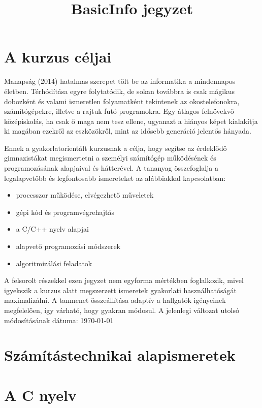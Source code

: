 \documentclass[11pt,a4paper,oneside]{report}             %
\begin{document}
\title{BasicInfo jegyzet}
\maketitle

\tableofcontents


\chapter*{A kurzus céljai}
Manapság (2014) hatalmas szerepet tölt be az informatika a mindennapos életben. Térhódítása egyre folytatódik, de sokan továbbra is csak mágikus dobozként és valami ismeretlen folyamatként tekintenek az okostelefonokra, számítógépekre, illetve a rajtuk futó programokra. Egy átlagos felnövekvő középiskolás, ha csak ő maga nem tesz ellene, ugyanazt a hiányos képet kialakítja ki magában ezekről az eszközökről, mint az idősebb generáció jelentős hányada.

Ennek a gyakorlatorientált kurzusnak a célja, hogy segítse az érdeklődő gimnazistákat megismertetni a személyi számítógép működésének és programozásának alapjaival és hátterével. A tananyag összefoglalja a legalapvetőbb és legfontosabb ismereteket az alábbiakkal kapcsolatban:
\begin{itemize}
  \item processzor működése, elvégezhető műveletek
  \item gépi kód és programvégrehajtás
  \item a C/C++ nyelv alapjai
  \item alapvető programozási módszerek
  \item algoritmizálási feladatok
\end{itemize}
A felsorolt részekkel ezen jegyzet nem egyforma mértékben foglalkozik, mivel igyekszik a kurzus alatt megszerzett ismeretek gyakorlati használhatóságát maximalizálni. A tanmenet összeállítása adaptív a hallgatók igényeinek megfelelően, így várható, hogy gyakran módosul. A jelenlegi változat utolsó módosításának dátuma: \today


\chapter{Számítástechnikai alapismeretek}
\label{01_bevezeto}
 

\chapter{A C nyelv}
\label{02_c_nyelv}
 
\end{document}
